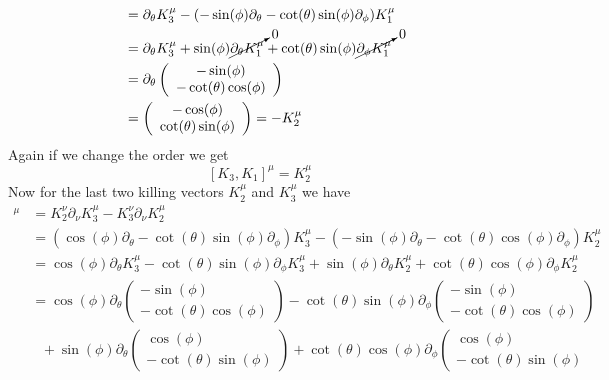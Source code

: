 \documentclass[11pt]{article}
\numberwithin{equation}{section}
\begin{document}
\begin{enumerate}[(a)]
\begin{align*}
&= \partial_{\theta}K^{\mu}_{3} -(-\sin(\phi)\partial_{\theta} - \cot(\theta)\sin(\phi)\partial_{\phi})K^{\mu}_{1}\\
&= \partial_{\theta}K^{\mu}_{3} + \sin(\phi)\cancelto{0}{\partial_{\theta}K^{\mu}_1} + \cot(\theta)\sin(\phi)\cancelto{0}{\partial_{\phi}K^{\mu}_{1}}\\
&= \partial_{\theta}\left(\begin{array}{c}
			-\sin(\phi)\\	-\cot(\theta)\cos(\phi)
		\end{array}\right)\\
&=\left(\begin{array}{c}
			-\cos(\phi)\\	\cot(\theta)\sin(\phi)
		\end{array}\right) = -K^{\mu}_2
\end{align*}
Again if we change the order we get
$$[K_3,K_1]^{\mu} = K^{\mu}_2$$
Now for the last two killing vectors $K^{\mu}_2$ and $K^{\mu}_3$ we have
\begin{align*}
[K_2,K_3]^{\mu} &= K^{\nu}_2\partial_{\nu}K^{\mu}_{3} -K^{\nu}_3\partial_{\nu}K^{\mu}_{2}\\
&= (\cos(\phi)\partial_{\theta} - \cot(\theta)\sin(\phi)\partial_{\phi})K^{\mu}_{3} - (-\sin(\phi)\partial_{\theta} - \cot(\theta)\cos(\phi)\partial_{\phi})K^{\mu}_{2}\\
&= \cos(\phi)\partial_{\theta}K^{\mu}_3 - \cot(\theta)\sin(\phi)\partial_{\phi}K^{\mu}_{3} + \sin(\phi)\partial_{\theta}K^{\mu}_2 + \cot(\theta)\cos(\phi)\partial_{\phi}K^{\mu}_{2}\\
&= \cos(\phi)\partial_{\theta}\left(\begin{array}{c}
				-\sin(\phi)\\	-\cot(\theta)\cos(\phi)
				\end{array}\right)
- \cot(\theta)\sin(\phi)\partial_{\phi}\left(\begin{array}{c}
				-\sin(\phi)\\	-\cot(\theta)\cos(\phi)
				\end{array}\right)\\
& \ \ \ + \sin(\phi)\partial_{\theta}\left(\begin{array}{c}
				\cos(\phi)\\	-\cot(\theta)\sin(\phi)
				\end{array}\right)
+ \cot(\theta)\cos(\phi)\partial_{\phi}\left(\begin{array}{c}
				\cos(\phi)\\	-\cot(\theta)\sin(\phi)

\end{array}
\end{align*}
\end{enumerate}
\end{document}
